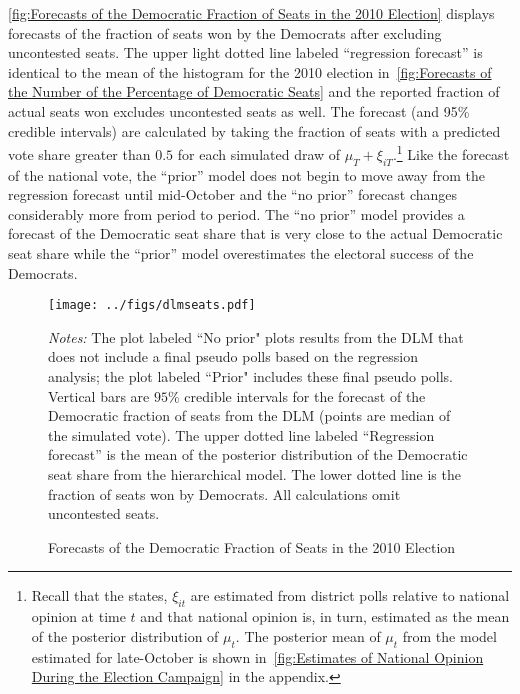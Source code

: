 \documentclass[12pt,final,fleqn]{article}
\theoremstyle{plain}
\begin{document}
\autoref{fig:Forecasts of the Democratic Fraction of Seats in the 2010 Election} displays forecasts of the fraction of seats won by the Democrats after excluding uncontested seats. The upper light dotted line labeled ``regression forecast'' is identical to the mean of the histogram for the 2010 election in~\autoref{fig:Forecasts of the Number of the Percentage of Democratic Seats} and the reported fraction of actual seats won excludes uncontested seats as well. The forecast (and 95\% credible intervals) are calculated by taking the fraction of seats with a predicted vote share greater than $0.5$ for each simulated draw of $\mu_T + \xi_{iT}$.\footnote{Recall that the states, $\xi_{it}$ are estimated from district polls relative to national opinion at time $t$ and that national opinion is, in turn, estimated as the mean of the posterior distribution of $\mu_t$. The posterior mean of $\mu_t$ from the model estimated for late-October is shown in~\autoref{fig:Estimates of National Opinion During the Election Campaign} in the appendix.} Like the forecast of the national vote, the ``prior'' model does not begin to move away from the regression forecast until mid-October and the ``no prior'' forecast changes considerably more from period to period. The ``no prior'' model provides a forecast of the Democratic seat share that is very close to the actual Democratic seat share while the ``prior'' model overestimates the electoral success of the Democrats. 

\begin{figure}[!htb]
\centering
\texttt{[image: ../figs/dlmseats.pdf]}
\vspace{.5cm}
\caption{Forecasts of the Democratic Fraction of Seats in the 2010 Election}
\label{fig:Forecasts of the Democratic Fraction of Seats in the 2010 Election}
\begin{minipage}{\linewidth}
\footnotesize
\emph{Notes:} The plot labeled ``No prior" plots results from the DLM that does not include a final pseudo polls based on the regression analysis; the plot labeled ``Prior" includes these final pseudo polls. Vertical bars are $95\%$ credible intervals for the forecast of the Democratic fraction of seats from the DLM (points are median of the simulated vote). The upper dotted line labeled ``Regression forecast'' is the mean of the posterior distribution of the Democratic seat share from the hierarchical model. The lower dotted line is the fraction of seats won by Democrats. All calculations omit uncontested seats.
\end{minipage}
\end{figure}
\end{document}
